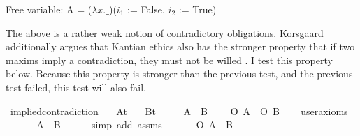 \begin{isabellebody}
{  Free variable:
    A = ($\lambda x. \_$)($i_1$ := False, $i_2$ := True) \color{black}%
}\isanewline
%
\isanewline
%
\endisatagproof
{\isafoldproof}%
%
\isadelimproof
%
\endisadelimproof
%
\isadelimproof
%
\endisadelimproof
%
\isatagproof
%
\endisatagproof
{\isafoldproof}%
%
\isadelimproof
%
\endisadelimproof
%
\begin{isamarkuptext}%
The above is a rather weak notion of contradictory obligations. Korsgaard additionally argues that Kantian 
ethics also has the stronger property that if two maxims imply a contradiction, they must not be willed \citep{KorsgaardFUL}.
I test this property below. Because this property is stronger than the previous test, and the previous 
test failed, this test will also fail.%
\end{isamarkuptext}\isamarkuptrue%
\isamarkupfalse%
\ implied{\isacharunderscore}contradiction{\isacharcolon}\isanewline
\ \ \ A{\isacharcolon}{\isacharcolon}{\isachardoublequoteopen}t{\isachardoublequoteclose}\isanewline
\ \ \ B{\isacharcolon}{\isacharcolon}{\isachardoublequoteopen}t{\isachardoublequoteclose}\ \isanewline
\ \ \ {\isachardoublequoteopen}{\isasymTurnstile}{\isacharparenleft}\isactrlbold {\isasymnot}\ {\isacharparenleft}A\ \isactrlbold {\isasymand}\ B{\isacharparenright}{\isacharparenright}{\isachardoublequoteclose}\isanewline
\ \ \ {\isachardoublequoteopen}{\isasymTurnstile}{\isacharparenleft}\isactrlbold {\isasymnot}\ {\isacharparenleft}O\ {\isacharbraceleft}A{\isacharbraceright}\ \isactrlbold {\isasymand}\ O\ {\isacharbraceleft}B{\isacharbraceright}{\isacharparenright}{\isacharparenright}{\isachardoublequoteclose}\isanewline
\ \ \isamarkupfalse%
\ {\isacharbrackleft}user{\isacharunderscore}axioms{\isacharbrackright}\isanewline
%
\isadelimproof
%
\endisadelimproof
%
\isatagproof
{}\isamarkupfalse%
\ {\isacharminus}\ \isanewline
\ \ \isamarkupfalse%
\ {\isachardoublequoteopen}{\isasymTurnstile}{\isacharparenleft}\isactrlbold {\isasymnot}{\isacharparenleft}{\isasymdiamond}{\isacharparenleft}A\ \isactrlbold {\isasymand}\ B{\isacharparenright}{\isacharparenright}{\isacharparenright}{\isachardoublequoteclose}\isanewline
\ \ \ \ \isamarkupfalse%
\ {\isacharparenleft}simp\ add{\isacharcolon}\ assms{\isacharparenright}\isanewline
\ \ \isamarkupfalse%
\ \isamarkupfalse%
\ {\isachardoublequoteopen}{\isasymTurnstile}{\isacharparenleft}\isactrlbold {\isasymnot}\ {\isacharparenleft}O\ {\isacharbraceleft}A\ \isactrlbold {\isasymand}\ B{\isacharbraceright}{\isacharparenright}{\isacharparenright}{\isachardoublequoteclose}\ \isamarkupfalse%

\end{isabellebody}
